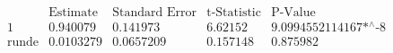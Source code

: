 \[\begin{array}{l|llll}
 \text{} & \text{Estimate} & \text{Standard Error} & \text{t-Statistic} & \text{P-Value} \\
\hline
 1 & 0.940079 & 0.141973 & 6.62152 & \text{9.0994552114167$\grave{ }$*${}^{\wedge}$-8} \\
 \text{runde} & 0.0103279 & 0.0657209 & 0.157148 & 0.875982 \\
\end{array}\]

